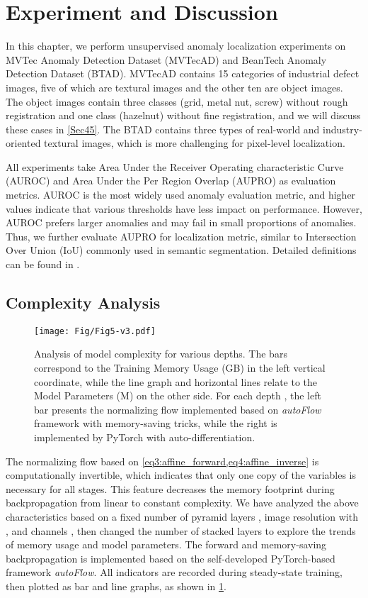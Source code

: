 \section{Experiment and Discussion}

In this chapter, we perform unsupervised anomaly localization experiments on MVTec Anomaly Detection Dataset\cite{MVTecAD} (MVTecAD) and BeanTech Anomaly Detection Dataset\cite{VT-ADL} (BTAD). 
MVTecAD contains 15 categories of industrial defect images, five of which are textural images and the other ten are object images. The object images contain three classes (grid, metal nut, screw) without rough registration and one class (hazelnut) without fine registration, and we will discuss these cases in \cref{Sec45}.
The BTAD contains three types of real-world and industry-oriented textural images, which is more challenging for pixel-level localization.

All experiments take Area Under the Receiver Operating characteristic Curve (AUROC) and Area Under the Per Region Overlap (AUPRO) as evaluation metrics.
AUROC is the most widely used anomaly evaluation metric, and higher values indicate that various thresholds have less impact on performance. However, AUROC prefers larger anomalies and may fail in small proportions of anomalies. 
Thus, we further evaluate AUPRO for localization metric, similar to Intersection Over Union (IoU) commonly used in semantic segmentation. Detailed definitions can be found in \cite{MVTecAD}.


\subsection{Complexity Analysis}\label{Sec41}
\begin{figure}
    \centering


    \texttt{[image: Fig/Fig5-v3.pdf]}
    \caption{Analysis of model complexity for various depths.
        The bars correspond to the Training Memory Usage (GB) in the left vertical coordinate, while the line graph and horizontal lines relate to the Model Parameters (M) on the other side. 
        For each depth , the left bar presents the normalizing flow implemented based on \textit{autoFlow} framework with memory-saving tricks, while the right is implemented by PyTorch with auto-differentiation. 
    }
    \label{fig5}
\end{figure}

The normalizing flow based on \cref{eq3:affine_forward,eq4:affine_inverse} is computationally invertible, which indicates that only one copy of the variables is necessary for all stages.
This feature decreases the memory footprint during backpropagation from linear to constant complexity. We have analyzed the above characteristics based on a fixed number of pyramid layers , image resolution with  , and channels , then changed the number of stacked layers  to explore the trends of memory usage and model parameters.
The forward and memory-saving backpropagation is implemented based on the self-developed PyTorch-based\cite{Pytorch} framework \textit{autoFlow}.
All indicators are recorded during steady-state training, then plotted as bar and line graphs, as shown in \cref{fig5}.


